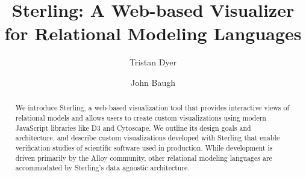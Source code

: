 \documentclass[runningheads]{llncs}
\begin{document}
\title{Sterling: A Web-based Visualizer\\ for Relational Modeling Languages}
\author{Tristan Dyer  \and John Baugh }



\maketitle
\begin{abstract}
We introduce Sterling, a web-based visualization tool that provides interactive views of relational models and allows users to create custom visualizations using modern JavaScript libraries like D3 and Cytoscape.
We outline its design goals and architecture, and describe custom visualizations developed with Sterling that enable verification studies of scientific software used in production.
While development is driven primarily by the Alloy community, other relational modeling languages are accommodated by Sterling's data agnostic architecture.
\end{abstract}

\end{document}
